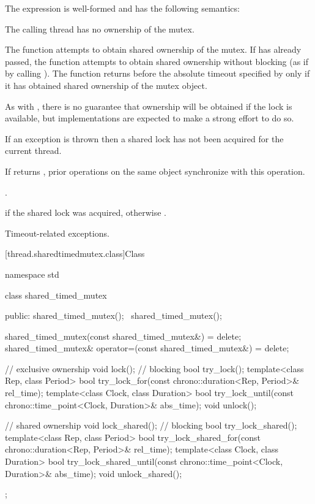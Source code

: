\pnum
The expression  is well-formed
and has the following semantics:
\begin{itemdescr}
\pnum
\expects
The calling thread has no ownership of the mutex.

\pnum
\effects
The function attempts to obtain shared ownership of the mutex. If
 has already passed, the function attempts to obtain shared
ownership without blocking (as if by calling ). The
function returns before the absolute timeout
specified by  only if it has obtained shared ownership of the
mutex object.
\begin{note}
As with , there is no guarantee that
ownership will be obtained if the lock is available, but implementations are
expected to make a strong effort to do so.
\end{note}
If an exception is thrown then a shared lock has not been acquired for
the current thread.

\pnum
\sync
If  returns , prior
 operations on the same object synchronize
with this operation.

\pnum
\returntype {}.

\pnum
\returns
{} if the shared lock was acquired, otherwise .

\pnum
\throws
Timeout-related exceptions.
\end{itemdescr}

[thread.sharedtimedmutex.class]{Class }

%
\begin{codeblock}
namespace std {
  class shared_timed_mutex {
  public:
    shared_timed_mutex();
    ~shared_timed_mutex();

    shared_timed_mutex(const shared_timed_mutex&) = delete;
    shared_timed_mutex& operator=(const shared_timed_mutex&) = delete;

    // exclusive ownership
    void lock();                // blocking
    bool try_lock();
    template<class Rep, class Period>
      bool try_lock_for(const chrono::duration<Rep, Period>& rel_time);
    template<class Clock, class Duration>
      bool try_lock_until(const chrono::time_point<Clock, Duration>& abs_time);
    void unlock();

    // shared ownership
    void lock_shared();         // blocking
    bool try_lock_shared();
    template<class Rep, class Period>
      bool try_lock_shared_for(const chrono::duration<Rep, Period>& rel_time);
    template<class Clock, class Duration>
      bool try_lock_shared_until(const chrono::time_point<Clock, Duration>& abs_time);
    void unlock_shared();
  };
}
\end{codeblock}

